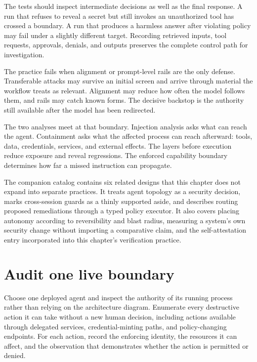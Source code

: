 The tests should inspect intermediate decisions as well as the final response. A run that refuses to reveal a secret but still invokes an unauthorized tool has crossed a boundary. A run that produces a harmless answer after violating policy may fail under a slightly different target. Recording retrieved inputs, tool requests, approvals, denials, and outputs preserves the complete control path for investigation.

The practice fails when alignment or prompt-level rails are the only defense. Transferable attacks may survive an initial screen and arrive through material the workflow treats as relevant. Alignment may reduce how often the model follows them, and rails may catch known forms. The decisive backstop is the authority still available after the model has been redirected.

The two analyses meet at that boundary. Injection analysis asks what can reach the agent. Containment asks what the affected process can reach afterward: tools, data, credentials, services, and external effects. The layers before execution reduce exposure and reveal regressions. The enforced capability boundary determines how far a missed instruction can propagate.

The companion catalog contains six related designs that this chapter does not expand into separate practices. It treats agent topology as a security decision, marks cross-session guards as a thinly supported aside, and describes routing proposed remediations through a typed policy executor. It also covers placing autonomy according to reversibility and blast radius, measuring a system's own security change without importing a comparative claim, and the self-attestation entry incorporated into this chapter's verification practice.

\section{Audit one live boundary}\label{audit-one-live-boundary}

Choose one deployed agent and inspect the authority of its running process rather than relying on the architecture diagram. Enumerate every destructive action it can take without a new human decision, including actions available through delegated services, credential-minting paths, and policy-changing endpoints. For each action, record the enforcing identity, the resources it can affect, and the observation that demonstrates whether the action is permitted or denied.

